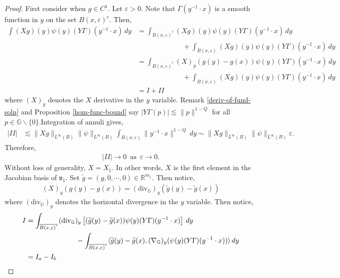 \documentclass[12pt,a4paper,reqno]{amsart}
\newcommand{\wt}{\widetilde}
\newcommand{\cg}{\Gamma}
\newcommand{\vf}{\mathfrak{v}}
\newcommand{\R}{\mathbb{R}}
\newcommand{\G}{\mathbb{G}}
\numberwithin{equation}{section}
\theoremstyle{definition}
\begin{document}
\begin{proof}
First consider when $g \in C^1$.
Let $\varepsilon > 0$. Note that $\cg(y^{-1}\cdot x)$ is a smooth function in $y$ on the set $B(x,\varepsilon)^c$. Then, 
\begin{align*}
\int (Xg)(y)\psi(y)(Y \cg)(y^{-1}\cdot x)\,dy &= \int_{\overline{B(x, \varepsilon)}^c} (Xg)(y)\psi(y)(Y \cg)(y^{-1}\cdot x)\,dy \\ &\,\,\,\,\,\,\,\,\,\,\,\,\,\,\,\,\,\,\,\,\,\,\,\,\,\,\,\,\,\,\,\,\,\,\,\,\,\,\, +\int_{B(x, \varepsilon)} (Xg)(y)\psi(y)(Y \cg)(y^{-1}\cdot x)\,dy \\ &= \int_{\overline{B(x, \varepsilon)}^c} (X)_y(g(y)-g(x))\psi(y)(Y \cg)(y^{-1}\cdot x)\,dy \\ &\,\,\,\,\,\,\,\,\,\,\,\,\,\,\,\,\,\,\,\,\,\,\,\,\,\,\,\,\,\,\,\,\,\,\,\,\,\,\, +\int_{\overline{B(x, \varepsilon)}} (Xg)(y)\psi(y)(Y \cg)(y^{-1}\cdot x)\,dy  \\ &= I + II 
\end{align*}  
where $(X)_y$ denotes the $X$ derivative in the $y$ variable. Remark \ref{deriv-of-fund-soln} and Proposition \ref{hom-func-bound} say $|Y \cg(p)|\lesssim \| p\|^{1-Q}$ for all $p \in \G \backslash \{0\}$.Integration of annuli gives, \begin{align*}
    |II| &\lesssim \| Xg\|_{L^{\infty}(B)} \| \psi\|_{L^{\infty}(B)} \int_{B(x, \varepsilon)} \| y^{-1}\cdot x\|^{1-Q}\, dy \sim \| X g\|_{L^{\infty}(B)} \| \psi\|_{L^{\infty}(B)} \varepsilon.
\end{align*}
Therefore, \begin{align}
    |II| \rightarrow 0 \,\text{ as }\,\varepsilon\rightarrow 0.\label{II-zero}
\end{align}
Without loss of generality, $X = X_1$. In other words, $X$ is the first element in the Jacobian basis of $\vf_1$. Set $\wt{g} = (g,0, \cdots, 0) \in \R^{m_1}$. Then notice, \begin{align*}
    (X)_y(g(y) - g(x)) = (\text{div}_{\G})_y(\wt{g}(y) - \wt{g}(x))
\end{align*}
where $(\text{div}_{\G})_y$ denotes the horizontal divergence in the $y$ variable. Then notice, \begin{align*}
I &= \int_{\overline{B(x, \varepsilon)}^c} (\text{div}_{\G})_y\left[ (\wt{g}(y) - \wt{g}(x))\psi(y) (Y \cg)(y^{-1}\cdot x)  \right] \,dy  \\ &\hspace{25mm}-\int_{\overline{B(x, \varepsilon)}^c} \langle \wt{g}(y) -\wt{g}(x), (\nabla_{\G})_y(\psi(y)(Y \cg)(y^{-1}\cdot x))\rangle\,dy \\ &=  I_a - I_b

\end{align*}
\end{proof}
\end{document}
